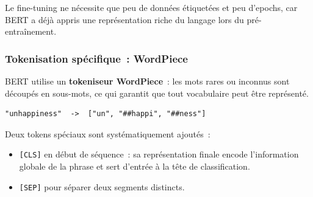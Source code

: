 \documentclass[12pt,a4paper]{article}
\begin{document}
Le fine-tuning ne nécessite que peu de données étiquetées et peu d'epochs, car BERT
a déjà appris une représentation riche du langage lors du pré-entraînement.

\subsubsection{Tokenisation spécifique~: WordPiece}

BERT utilise un \textbf{tokeniseur WordPiece}~: les mots rares ou inconnus sont découpés
en sous-mots, ce qui garantit que tout vocabulaire peut être représenté.

\begin{lstlisting}[language={}]
"unhappiness"  ->  ["un", "##happi", "##ness"]
\end{lstlisting}

Deux tokens spéciaux sont systématiquement ajoutés~:
\begin{itemize}[leftmargin=1.5cm]
  \item \texttt{[CLS]} en début de séquence~: sa représentation finale encode
    l'information globale de la phrase et sert d'entrée à la tête de classification.
  \item \texttt{[SEP]} pour séparer deux segments distincts.
\end{itemize}
\end{document}
